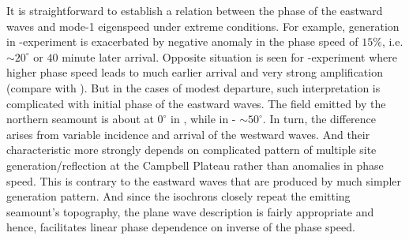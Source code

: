 \documentclass[12pt]{article}
\begin{document}
It is straightforward to establish a relation between the phase of the eastward waves and mode-1 
eigenspeed under extreme conditions. For example, generation in -experiment is  
exacerbated by negative anomaly in the phase speed of $15\%$, i.e. $\sim 20^{\circ}$ or $40$ minute 
later arrival. Opposite situation is seen for -experiment where higher phase speed 
leads to much earlier arrival and very strong amplification (compare  with 
). But in the 
cases of modest departure, such interpretation is complicated with initial phase of the 
eastward waves. The field emitted by the northern seamount is about at $0^{\circ}$ in , 
while in  - $\sim 50^{\circ}$. In turn, the difference 
arises from variable incidence and arrival of the westward waves. And their characteristic more 
strongly depends on complicated pattern of multiple site generation/reflection at the Campbell 
Plateau rather than anomalies in phase speed. This is contrary to the eastward waves that are 
produced by much simpler generation pattern. And since the isochrons closely repeat the emitting 
seamount's topography, the plane wave description is fairly appropriate and hence, facilitates 
linear phase dependence on inverse of the phase speed.\\
\end{document}
